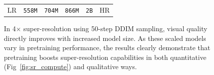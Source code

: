 \begin{figure}[!ht]
\begin{tabular}[t]{c c c c c c}
    \\[-0.2em]
    \scriptsize LR &  \scriptsize \texttt{558M} & \scriptsize \texttt{704M} & \scriptsize \texttt{866M} & \scriptsize \texttt{2B} & \scriptsize HR
    \end{tabular}
    \caption{In 4$\times$ super-resolution using 50-step DDIM sampling, visual quality directly improves with increased model size. As these scaled models vary in pretraining performance, the results clearly demonstrate that pretraining boosts super-resolution capabilities in both quantitative (Fig~\ref{fig:sr_compute}) and qualitative ways.
    }
    \label{fig:sr}
\end{figure}

